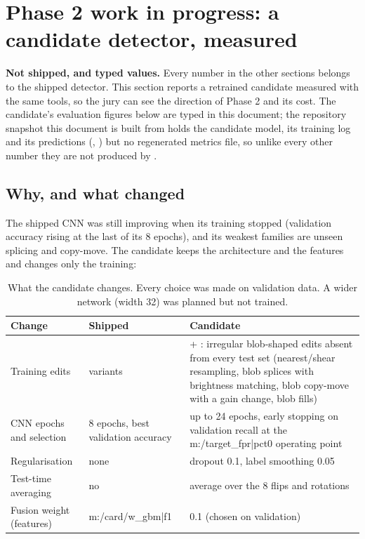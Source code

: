 \section{Phase 2 work in progress: a candidate detector, measured}\label{sec:phase2}
\begin{warnbox}
\textbf{Not shipped, and typed values.} Every number in the other sections belongs to the shipped detector. This section reports a retrained candidate measured with the same tools, so the jury can see the direction of Phase 2 and its cost. The candidate's evaluation figures below are typed in this document; the repository snapshot this document is built from holds the candidate model, its training log and its predictions (, ) but no regenerated metrics file, so unlike every other number they are not produced by .
\end{warnbox}

\subsection{Why, and what changed}
The shipped CNN was still improving when its training stopped (validation accuracy rising at the last of its 8 epochs), and its weakest families are unseen splicing and copy-move. The candidate keeps the architecture and the features and changes only the training:

\begin{table}[!htbp]
\centering\small
\begin{tabularx}{\textwidth}{|L{3.6cm}|L{3.6cm}|Y|}
\hline
\textbf{Change} & \textbf{Shipped} & \textbf{Candidate}\\
\hline
Training edits &  variants &  + : irregular blob-shaped edits absent from every test set (nearest/shear resampling, blob splices with brightness matching, blob copy-move with a gain change, blob fills)\\
\hline
CNN epochs and selection & 8 epochs, best validation accuracy & up to 24 epochs, early stopping on validation recall at the {{m:/target_fpr|pct0}} operating point\\
\hline
Regularisation & none & dropout 0.1, label smoothing 0.05\\
\hline
Test-time averaging & no & average over the 8 flips and rotations\\
\hline
Fusion weight (features) & {{m:/card/w_gbm|f1}} & 0.1 (chosen on validation)\\
\hline
\end{tabularx}
\caption{What the candidate changes. Every choice was made on validation data. A wider network (width 32) was planned but not trained.}
\end{table}

